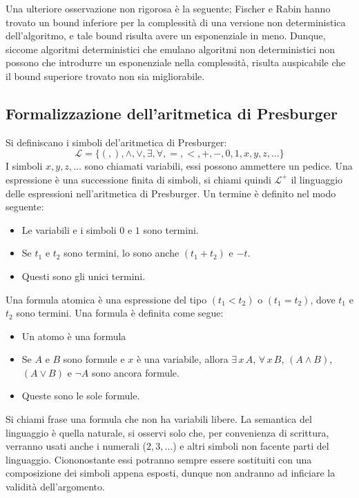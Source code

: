 \documentclass[11pt,letterpaper,twoside]{article}
\begin{document}
Una ulteriore osservazione non rigorosa è la seguente; Fischer e Rabin
\autocite{fischer-rabin} hanno trovato un bound inferiore per la complessità di
una versione non deterministica dell'algoritmo, e tale bound risulta avere un
esponenziale in meno. Dunque, siccome algoritmi deterministici che emulano
algoritmi non deterministici non possono che introdurre un esponenziale nella
complessità, risulta auspicabile che il bound superiore trovato non sia
migliorabile.


\subsection{Formalizzazione dell'aritmetica di Presburger}
Si definiscano i simboli del'aritmetica di Presburger:
$$ \mathscr{L} = \{(, ), \land, \lor, \exists, \forall, =, <, +, -, 0, 1, x, y,
z, \dots \}$$
I simboli $x, y, z, \dots$ sono chiamati variabili, essi possono ammettere un
pedice. Una espressione è una successione finita di simboli, si chiami quindi
$\mathscr{L}^{+}$ il linguaggio delle espressioni nell'aritmetica di Presburger.
Un termine è definito nel modo seguente:

\begin{itemize}
  \item Le variabili e i simboli $0$ e $1$ sono termini.
  \item Se $t_1$ e $t_2$ sono termini, lo sono anche $(t_1 + t_2)$ e $-t$.
  \item Questi sono gli unici termini.
\end{itemize}

Una formula atomica è una espressione del tipo $(t_1 < t_2)$ o $(t_1 = t_2)$,
dove $t_1$ e $t_2$ sono termini.
Una formula è definita come segue:
\begin{itemize}
  \item Un atomo è una formula
  \item Se $A$ e $B$ sono formule e $x$ è una variabile, allora $\exists \, x \,
    A$, $\forall \, x \, B$, $(A \land B)$, $(A \lor B)$ e $\lnot A$ sono ancora formule.
  \item Queste sono le sole formule.
\end{itemize}

Si chiami frase una formula che non ha variabili libere.
La semantica del linguaggio è quella naturale, si osservi solo che, per
convenienza di scrittura, verranno usati anche i numerali ($2, 3, \dots$) e
altri simboli non facente parti del linguaggio. Ciononostante essi potranno
sempre essere sostituiti con una composizione dei simboli appena esposti, dunque
non andranno ad inficiare la validità dell'argomento.
\end{document}
